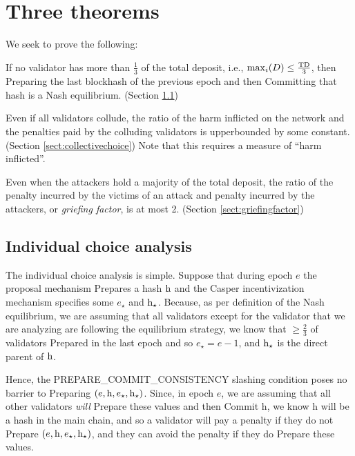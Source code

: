 \documentclass[12pt, final]{article}
\newcommand{\epoch}{\ensuremath{e}\xspace}
\newcommand{\hash}{\textnormal{h}\xspace}
\newcommand{\hashsource}{\ensuremath{\hash_{\star}}\xspace}
\newcommand{\epochsource}{\ensuremath{\epoch_{\star}}\xspace}
\newcommand{\totaldeposit}{\textnormal{TD}\xspace}
\begin{document}
\section{Three theorems}

We seek to prove the following:

\begin{theorem}
\label{theorem1}
If no validator has more than $\frac{1}{3}$ of the total deposit, i.e., $\max_i(D) \leq \frac{\totaldeposit}{3}$, then Preparing the last blockhash of the previous epoch and then Committing that hash is a Nash equilibrium. (Section \ref{sect:indivchoice})
\end{theorem}

\begin{theorem}
\label{theorem2}
Even if all validators collude, the ratio of the harm inflicted on the network and the penalties paid by the colluding validators is upperbounded  by some constant. (Section \ref{sect:collectivechoice})  Note that this requires a measure of ``harm inflicted''.
\end{theorem}

\begin{theorem}
\label{theorem3}
Even when the attackers hold a majority of the total deposit, the ratio of the penalty incurred by the victims of an attack and penalty incurred by the attackers, or \emph{griefing factor}, is at most 2. (Section \ref{sect:griefingfactor})
\end{theorem}

\subsection{Individual choice analysis}
\label{sect:indivchoice}

The individual choice analysis is simple. Suppose that during epoch $\epoch$ the proposal mechanism Prepares a hash $\hash$ and the Casper incentivization mechanism specifies some $\epochsource$ and $\hashsource$. Because, as per definition of the Nash equilibrium, we are assuming that all validators except for the validator that we are analyzing are following the equilibrium strategy, we know that $\ge \frac{2}{3}$ of validators Prepared in the last epoch and so $\epochsource = \epoch - 1$, and $\hashsource$ is the direct parent of $\hash$.

Hence, the PREPARE\_COMMIT\_CONSISTENCY slashing condition poses no barrier to Preparing $(\epoch, \hash, \epochsource, \hashsource)$. Since, in epoch \epoch, we are assuming that all other validators \emph{will} Prepare these values and then Commit \hash, we know \hash will be a hash in the main chain, and so a validator will pay a penalty if they do not Prepare $(\epoch, \hash, \epochsource, \hashsource)$, and they can avoid the penalty if they do Prepare these values.
\end{document}
